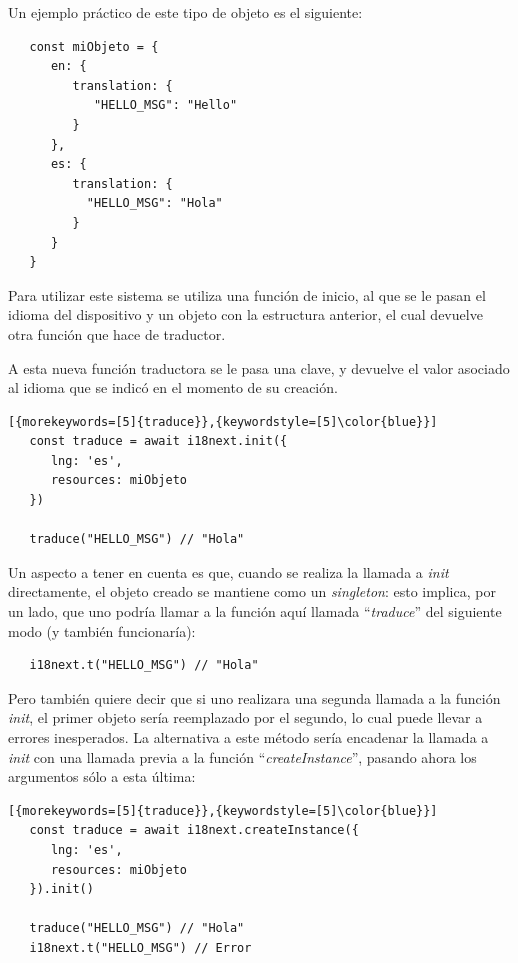 \documentclass[11pt,spanish,listoffigures,listoftables,table,hyphens,dvipsnames]{tfgetsinf}
\begin{document}
Un ejemplo práctico de este tipo de objeto es el siguiente:

\begin{lstlisting}
   const miObjeto = {
      en: {
         translation: {
            "HELLO_MSG": "Hello"
         }
      },
      es: {
         translation: {
           "HELLO_MSG": "Hola"
         }
      }
   }
\end{lstlisting}

Para utilizar este sistema se utiliza una función de inicio, al que se le pasan el idioma del dispositivo y un objeto con la estructura anterior, el cual devuelve otra función que hace de traductor.

A esta nueva función traductora se le pasa una clave, y devuelve el valor asociado al idioma que se indicó en el momento de su creación.

\begin{lstlisting}[{morekeywords=[5]{traduce}},{keywordstyle=[5]\color{blue}}]
   const traduce = await i18next.init({
      lng: 'es',
      resources: miObjeto
   })

   traduce("HELLO_MSG") // "Hola"
\end{lstlisting}

Un aspecto a tener en cuenta es que, cuando se realiza la llamada a \emph{init} directamente, el objeto creado se mantiene como un \emph{singleton}: esto implica, por un lado, que uno podría llamar a la función aquí llamada ``\emph{traduce}'' del siguiente modo (y también funcionaría):

\begin{lstlisting}
   i18next.t("HELLO_MSG") // "Hola"
\end{lstlisting}

Pero también quiere decir que si uno realizara una segunda llamada a la función \emph{init}, el primer objeto sería reemplazado por el segundo, lo cual puede llevar a errores inesperados. La alternativa a este método sería encadenar la llamada a \emph{init} con una llamada previa a la función ``\emph{createInstance}'', pasando ahora los argumentos sólo a esta última:

\begin{lstlisting}[{morekeywords=[5]{traduce}},{keywordstyle=[5]\color{blue}}]
   const traduce = await i18next.createInstance({
      lng: 'es',
      resources: miObjeto
   }).init()

   traduce("HELLO_MSG") // "Hola"
   i18next.t("HELLO_MSG") // Error
\end{lstlisting}
\end{document}
